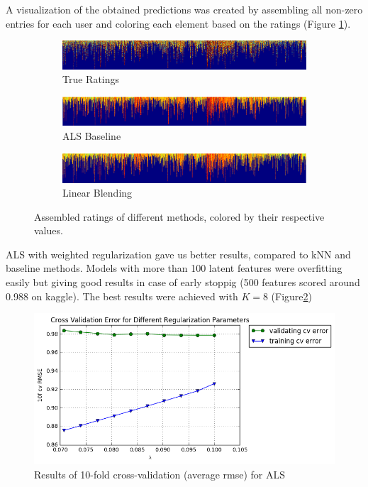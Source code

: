 A visualization of the obtained predictions was created by 
assembling all non-zero entries for each user and coloring each element
based on the ratings (Figure \ref{fig:matrix}).   

\begin{figure}[!tbp]
  \begin{subfigure}[b]{0.99\columnwidth}
    \includegraphics[width=.99\columnwidth]{figures/matrix_validation_clipped.png}
    \caption{True Ratings}
  \end{subfigure}
  \hfill
  \begin{subfigure}[b]{0.99\columnwidth}
    \includegraphics[width=.99\columnwidth]{figures/matrix_validation_1_clipped.png}
    \caption{ALS Baseline}
  \end{subfigure}
  \begin{subfigure}[b]{0.99\columnwidth}
    \includegraphics[width=.99\columnwidth]{figures/matrix_blending_clipped.png}
    \caption{Linear Blending}
  \end{subfigure}
  \caption{Assembled ratings of different methods, colored by their respective
  values.}
  \label{fig:matrix}
\end{figure}

ALS with weighted regularization gave us better results, compared to kNN and
baseline methods. Models with more than 100 latent features were overfitting
easily but giving good results in case of early stoppig (500 features scored
around 0.988 on kaggle). The best results were achieved with $K=8$
(Figure\ref{fig:als_cv})
 
\begin{figure}[!tbp]
  \centering
  \includegraphics[width=.9\columnwidth]{figures/scaled_trainavg_testavg.png}
  \caption{Results of 10-fold cross-validation (average rmse) for ALS}
  \label{fig:als_cv}
  \centering
\end{figure}

